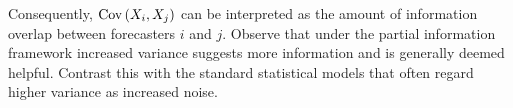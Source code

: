 \documentclass[11pt]{article}
\newcommand{\E}{\mathbb{E}}
\theoremstyle{definition}
\theoremstyle{definition}
\def\one{{\bf 1}}
\def\bSigma{{\bf \Sigma}}
\def\F{{\cal F}}
\def\G{{\cal G}}
\def\E{{\mathbb E}}
\def\Var{{\rm Var}\,}
\def\Cov{{\rm Cov}\,}
\begin{document}
 Consequently, $\Cov (X_{i} , X_{j})$ can be interpreted as the amount of information overlap between forecasters $i$ and
$j$. Observe that under the partial information framework increased variance suggests more information and is generally deemed helpful. Contrast this with the standard statistical models that often regard higher variance as increased noise. 







\end{document}
